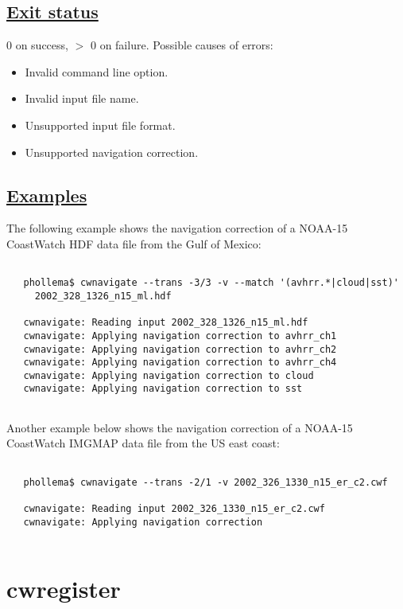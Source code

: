 \subsection*{\underline{Exit status}}


  0 on success, $>$ 0 on failure. Possible causes of errors:
\begin{itemize}
\item  Invalid command line option. 
\item  Invalid input file name. 
\item  Unsupported input file format. 
\item  Unsupported navigation correction. 

\end{itemize}
\subsection*{\underline{Examples}}


 The following example shows the navigation correction of a NOAA-15 CoastWatch HDF data file from the Gulf of Mexico:
\begin{verbatim}

   phollema$ cwnavigate --trans -3/3 -v --match '(avhrr.*|cloud|sst)' 
     2002_328_1326_n15_ml.hdf

   cwnavigate: Reading input 2002_328_1326_n15_ml.hdf
   cwnavigate: Applying navigation correction to avhrr_ch1
   cwnavigate: Applying navigation correction to avhrr_ch2
   cwnavigate: Applying navigation correction to avhrr_ch4
   cwnavigate: Applying navigation correction to cloud
   cwnavigate: Applying navigation correction to sst
 
\end{verbatim}


 Another example below shows the navigation correction of a NOAA-15 CoastWatch IMGMAP data file from the US east coast:
\begin{verbatim}

   phollema$ cwnavigate --trans -2/1 -v 2002_326_1330_n15_er_c2.cwf

   cwnavigate: Reading input 2002_326_1330_n15_er_c2.cwf
   cwnavigate: Applying navigation correction
 
\end{verbatim}

\newpage
\section{cwregister} \hypertarget{cwregister}{}
